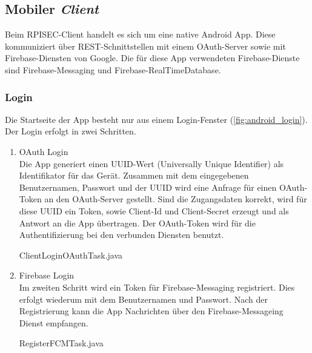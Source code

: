 \subsection{Mobiler \emph{Client}}

Beim RPISEC-Client handelt es sich um eine native Android App. Diese kommuniziert über REST-Schnittstellen mit einem OAuth-Server sowie mit Firebase-Diensten von Google. Die für diese App verwendeten Firebase-Dienste sind Firebase-Messaging und Firebase-RealTimeDatabase.\\

\subsubsection{Login}

Die Startseite der App besteht nur aus einem Login-Fenster (\autoref{fig:android_login}). Der Login erfolgt in zwei Schritten.

\begin{enumerate}
	\item OAuth Login\\
	\newline
	Die App generiert einen UUID-Wert (Universally Unique Identifier) als Identifikator für das Gerät. Zusammen mit dem eingegebenen Benutzernamen, Passwort und der UUID wird eine Anfrage für einen OAuth-Token an den OAuth-Server gestellt. Sind die Zugangsdaten korrekt, wird für diese UUID ein Token, sowie Client-Id und Client-Secret erzeugt und als Antwort an die App übertragen. Der OAuth-Token wird für die Authentifizierung bei den verbunden Diensten benutzt.\\
	
	\begin{code}
		\caption{ClientLoginOAuthTask.java}
		\label{src:ClientLoginOAuthTask}
	\end{code}
	
	\pagebreak
	
	\item  Firebase Login\\
	\newline
	Im zweiten Schritt wird ein Token für Firebase-Messaging registriert. Dies erfolgt wiederum mit dem Benutzernamen und Passwort. Nach der Registrierung kann die App Nachrichten über den Firebase-Messageing Dienst empfangen.\\
	
	\begin{code}
		\caption{RegisterFCMTask.java}
		\javaFile{\srcDir/RegisterFCMTask.java}
		\label{src:RegisterFCMTask}
	\end{code}
\end{enumerate}

